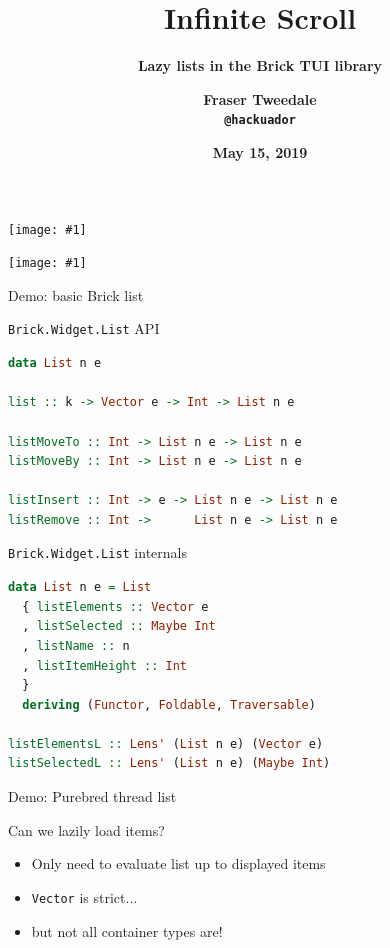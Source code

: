 \documentclass[ignorenonframetext,aspectratio=169,dvipsnames]{beamer}
\title{\Huge \bf Infinite Scroll}
\subtitle{\Large \bf Lazy lists in the Brick TUI library}
\author{\Large \bf Fraser Tweedale\\
    \texttt{@hackuador}}
\date{\large \bf May 15, 2019}
\newcommand{\includegraphicsscaled}[1]{
    \texttt{[image: \#1]}
}
\begin{document}
\begin{frame}
\titlepage
\end{frame}

\begin{frame}[plain]
\begin{center}
\includegraphicsscaled{../2018-05-22-ylj-ffi/purebred.png}
\end{center}
\end{frame}

\begin{frame}[plain]
\begin{center}
\includegraphicsscaled{brick-final-whitebg.png}
\end{center}
\end{frame}

\begin{frame}[plain]
\huge
  Demo: basic Brick list
\end{frame}

\begin{frame}[fragile]{{\tt Brick.Widget.List} API}
\begin{lstlisting}[language=Haskell]
data List n e

list :: k -> Vector e -> Int -> List n e

listMoveTo :: Int -> List n e -> List n e
listMoveBy :: Int -> List n e -> List n e

listInsert :: Int -> e -> List n e -> List n e
listRemove :: Int ->      List n e -> List n e
\end{lstlisting}
\end{frame}

\begin{frame}[fragile]{{\tt Brick.Widget.List} internals}
\begin{lstlisting}[language=Haskell]
data List n e = List
  { listElements :: Vector e
  , listSelected :: Maybe Int
  , listName :: n
  , listItemHeight :: Int
  }
  deriving (Functor, Foldable, Traversable)

listElementsL :: Lens' (List n e) (Vector e)
listSelectedL :: Lens' (List n e) (Maybe Int)
\end{lstlisting}
\end{frame}

\begin{frame}[plain]
\huge
  Demo: Purebred thread list
\end{frame}

\begin{frame}{Can we lazily load items?}
    \begin{itemize}
        \item Only need to evaluate list up to displayed items
        \item<+-> {\tt Vector} is strict...
        \item<+-> but not all container types are!  %
    \end{itemize}
\end{frame}
\end{document}
